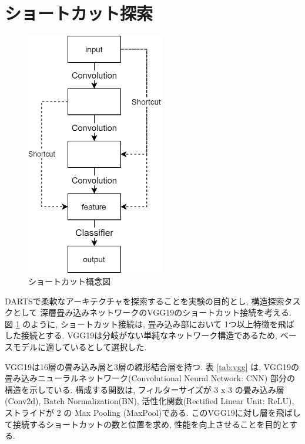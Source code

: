 \newpage
\changeindent{0cm}
\section{ショートカット探索}
\label{sec:pred}
\changeindent{2cm}

\begin{figure}[t]
  \begin{center}
    \includegraphics[clip,width=6cm]{./fig/03.pred/image.png}
  \end{center}
  \caption{ショートカット概念図}
  \label{fig:image}
\end{figure}

DARTSで柔軟なアーキテクチャを探索することを実験の目的とし, 構造探索タスクとして
深層畳み込みネットワークのVGG19\cite{Simonyan15}のショートカット接続を考える.
図 \ref{fig:image} のように, ショートカット接続は, 畳み込み部において 1つ以上特徴を飛ばした接続とする.
VGG19は分岐がない単純なネットワーク構造であるため, ベースモデルに適しているとして選択した.

VGG19は16層の畳み込み層と3層の線形結合層を持つ.
表 \ref{tab:vgg} は, VGG19の畳み込みニューラルネットワーク(Convolutional Neural Network: CNN) 部分の構造を示している. 構成する関数は, フィルターサイズが 3 x 3 の畳み込み層(Conv2d), Batch Normalization(BN), 活性化関数(Rectified Linear Unit: ReLU), ストライドが 2 の Max Pooling (MaxPool)である.
このVGG19に対し層を飛ばして接続するショートカットの数と位置を求め,
性能を向上させることを目的とする.

